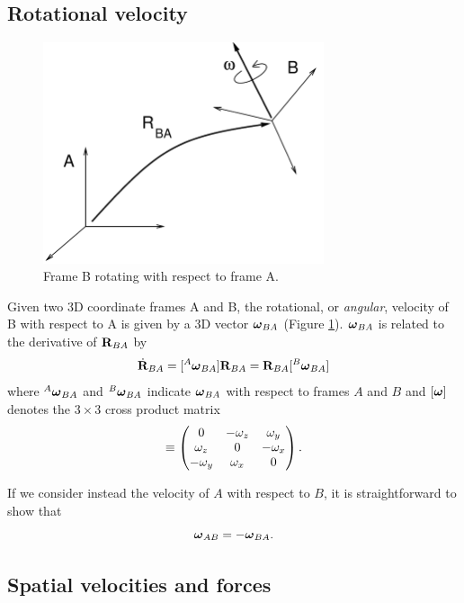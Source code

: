 \subsection{Rotational velocity}

\begin{figure}[h]
\begin{center}
 \includegraphics[width=3.25in]{images/angularvelAB}
\end{center}
\caption{Frame B rotating with respect to frame A.}
\label{angularvelAB:fig}
\end{figure}

Given two 3D coordinate frames A and B, the rotational, or {\it
angular}, velocity of B with respect to A is given by a 3D vector
$\boldsymbol\omega_{BA}$ (Figure \ref{angularvelAB:fig}). $\boldsymbol\omega_{BA}$
is related to the derivative of ${\bf R}_{BA}$ by
%
\begin{equation}
\dot{{\bf R}}_{BA} = [{}^A\boldsymbol\omega_{BA}] {\bf R}_{BA} = {\bf R}_{BA} [{}^B\boldsymbol\omega_{BA}]
\end{equation}
%
where ${}^A\boldsymbol\omega_{BA}$ and ${}^B\boldsymbol\omega_{BA}$ indicate $\boldsymbol\omega_{BA}$ with
respect to frames $A$ and $B$ and $[ \boldsymbol\omega ]$ denotes the $3 \times 3$
cross product matrix
%
\begin{equation}
[ \Bom ] \equiv 
\matl
0 & -\omega_z & \omega_y \\
\omega_z & 0 & -\omega_x \\
-\omega_y & \omega_x & 0 \\
\matr.
\label{xprodmatrix:eqn}
\end{equation}
%

If we consider instead the velocity of $A$ with respect to $B$, it is
straightforward to show that
%
\begin{equation}
\boldsymbol\omega_{AB} = -\boldsymbol\omega_{BA}. 
\end{equation}
%

\subsection{Spatial velocities and forces}
\label{SpatialVelocitiesAndForces:sec}

